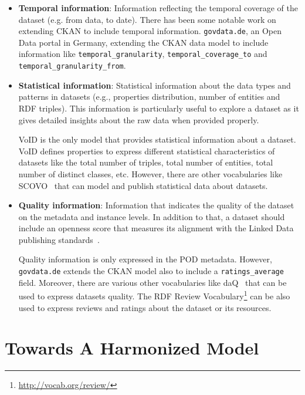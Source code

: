 \documentclass[runningheads,a4paper]{llncs}
\begin{document}
\begin{itemize}
\item \textbf{Temporal information}: Information reflecting the temporal coverage of the dataset (e.g. from data, to date).
There has been some notable work on extending CKAN to include temporal information. \texttt{govdata.de}, an Open Data portal in Germany, extending the CKAN data model to include information like \texttt{temporal\_granularity}, \texttt{temporal\_coverage\_to} and \\\texttt{temporal\_granularity\_from}.

\item \textbf{Statistical information}: Statistical information about the data types and patterns in datasets (e.g., properties distribution, number of entities and RDF triples). This information is particularly useful to explore a dataset as it gives detailed insights about the raw data when provided properly.

VoID is the only model that provides statistical information about a dataset. VoID defines properties to express different statistical characteristics of datasets like the total number of triples, total number of entities, total number of distinct classes, etc. However, there are other vocabularies like SCOVO~\cite{Hausenblas:09:ESWC} that can model and publish statistical data about datasets.

\item \textbf{Quality information}: Information that indicates the quality of the dataset on the metadata and instance levels. In addition to that, a dataset should include an openness score that measures its alignment with the Linked Data publishing standards~\cite{tim:linkedata}.

Quality information is only expressed in the POD metadata. However, \texttt{govdata.de} extends the CKAN model also to include a \texttt{ratings\_average} field. Moreover, there are various other vocabularies like daQ~\cite{Debattista:14:www} that can be used to express datasets quality. The RDF Review Vocabulary\footnote{\url{http://vocab.org/review/}} can be also used to express reviews and ratings about the dataset or its resources.
\end{itemize}



\section{Towards A Harmonized Model}
\label{sec:hdl}
\end{document}
